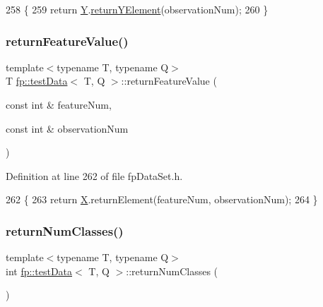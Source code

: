 \begin{DoxyCode}
258                                                                     \{
259             \textcolor{keywordflow}{return} \hyperlink{classfp_1_1testData_a9421a63841491860ddeeb1f7fa0d4219}{Y}.\hyperlink{classfp_1_1inputYData_a974ab138d49f7e5b3fded09f02486710}{returnYElement}(observationNum);
260         \}
\end{DoxyCode}
\mbox{\label{classfp_1_1testData_a0c49c5fc2f1bf3fc39c7d55413cddabf}} 
\subsubsection{\texorpdfstring{return\+Feature\+Value()}{returnFeatureValue()}}
{\footnotesize\ttfamily template$<$typename T, typename Q$>$ \\
T \hyperlink{classfp_1_1testData}{fp\+::test\+Data}$<$ T, Q $>$\+::return\+Feature\+Value (\begin{DoxyParamCaption}\item[{const int \&}]{feature\+Num,  }\item[{const int \&}]{observation\+Num }\end{DoxyParamCaption})\hspace{0.3cm}{\ttfamily [inline]}}



Definition at line 262 of file fp\+Data\+Set.\+h.


\begin{DoxyCode}
262                                                                                      \{
263             \textcolor{keywordflow}{return} \hyperlink{classfp_1_1testData_ad85120d23de2f6c10d6e9455e5f5adb9}{X}.returnElement(featureNum, observationNum);
264         \}
\end{DoxyCode}
\mbox{\label{classfp_1_1testData_ae9401fa71005e8c09cb38ed182cbf2ac}} 
\subsubsection{\texorpdfstring{return\+Num\+Classes()}{returnNumClasses()}}
{\footnotesize\ttfamily template$<$typename T, typename Q$>$ \\
int \hyperlink{classfp_1_1testData}{fp\+::test\+Data}$<$ T, Q $>$\+::return\+Num\+Classes (\begin{DoxyParamCaption}{ }\end{DoxyParamCaption})\hspace{0.3cm}{\ttfamily [inline]}}



